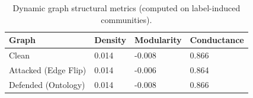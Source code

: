 \begin{table}[t]
\centering
\small
\begin{tabular}{llll}
\toprule
Graph & Density & Modularity & Conductance \\
\midrule
Clean & 0.014 & -0.008 & 0.866 \\
Attacked (Edge Flip) & 0.014 & -0.006 & 0.864 \\
Defended (Ontology) & 0.014 & -0.008 & 0.866 \\
\bottomrule
\end{tabular}

\caption{Dynamic graph structural metrics (computed on label-induced communities).}
\label{tab:graph_metrics_dynamic}
\end{table}
